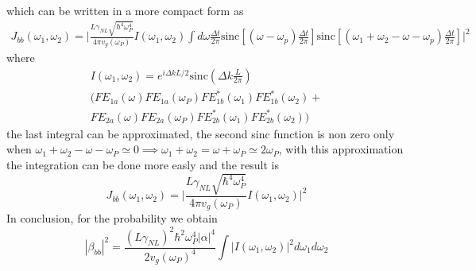 which can be written in a more compact form as
\begin{multline}J_{bb}(\omega_1,\omega_2) = \Bigg|\frac{L\gamma_{NL}\sqrt{\hbar^4\omega_P^4}}{4\pi v_g(\omega_P)}I(\omega_1,\omega_2) \int d\omega  \frac{\Delta t}{2\pi}\text{sinc}\left[(\omega-\omega_p) \frac{\Delta t}{2\pi} \right]\text{sinc}\left[(\omega_1+\omega_2-\omega-\omega_p) \frac{\Delta t}{2\pi} \right]\Bigg|^2\end{multline}
where 
\begin{multline}\label{Idefinition}
I(\omega_1,\omega_2) =  e^{i\Delta k L/2} \text{sinc}\left(\Delta k \frac{L}{2\pi}\right)\\ \Big( FE_{1a}(\omega)FE_{1a}(\omega_P)FE^*_{1b}(\omega_1)FE^*_{1b}(\omega_2) + \\ FE_{2a}(\omega)FE_{2a}(\omega_P)FE^*_{2b}(\omega_1)FE^*_{2b}(\omega_2)\Big)
\end{multline}
the last integral can be approximated, the second sinc function is non zero only when $\omega_1+\omega_2 - \omega - \omega_P \simeq 0 \implies  \omega_1+\omega_2 = \omega + \omega_P \simeq 2\omega_P$, with this approximation the integration can be done more easly and the result is
\begin{equation}J_{bb}(\omega_1,\omega_2) = \Bigg|\frac{L\gamma_{NL}\sqrt{\hbar^4\omega_P^4}}{4\pi v_g(\omega_P)}I(\omega_1,\omega_2)\Bigg|^2\end{equation}
In conclusion, for the probability we obtain
\begin{equation}\label{finalprobability}|\beta_{bb}|^2 = \frac{(L\gamma_{NL})^2\hbar^2\omega_{P}^4 |\alpha|^4}{2v_g(\omega_P)^4}\int |I(\omega_1,\omega_2)|^2d\omega_1 d\omega_2\end{equation}
